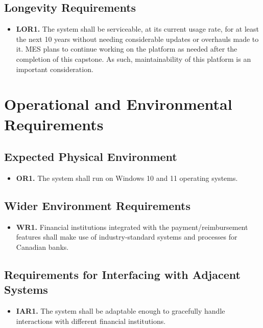 \documentclass[12pt]{article}
\begin{document}
\subsection{Longevity Requirements}

\label{LOR}

\begin{itemize}
    \item \textbf{LOR1.} The system shall be serviceable, at its current usage rate, for at least the next 10 years without needing considerable updates or overhauls made to it. MES plans to continue working on the platform as needed after the completion of this capstone. As such, maintainability of this platform is an important consideration.
\end{itemize}

\section{Operational and Environmental Requirements}
\subsection{Expected Physical Environment}

\label{OR1}

\begin{itemize}
    \item \textbf{OR1.} The system shall run on Windows 10 and 11 operating systems.
\end{itemize}

\subsection{Wider Environment Requirements}

\label{WR}

\begin{itemize}
    \item \textbf{WR1.} Financial institutions integrated with the payment/reimbursement features shall make use of industry-standard systems and processes for Canadian banks.
\end{itemize}

\subsection{Requirements for Interfacing with Adjacent Systems}

\label{IAR}

\begin{itemize}
    \item \textbf{IAR1.} The system shall be adaptable enough to gracefully handle interactions with different financial institutions.
\end{itemize}
\end{document}
